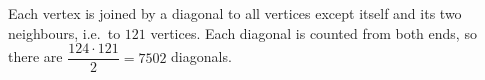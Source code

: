 Each vertex is joined by a diagonal to all vertices except itself and its two neighbours, i.e.\ to $121$ vertices. Each diagonal is counted from both ends, so there are $\dfrac{124\cdot121}{2}=\boxed{7502}$ diagonals.

